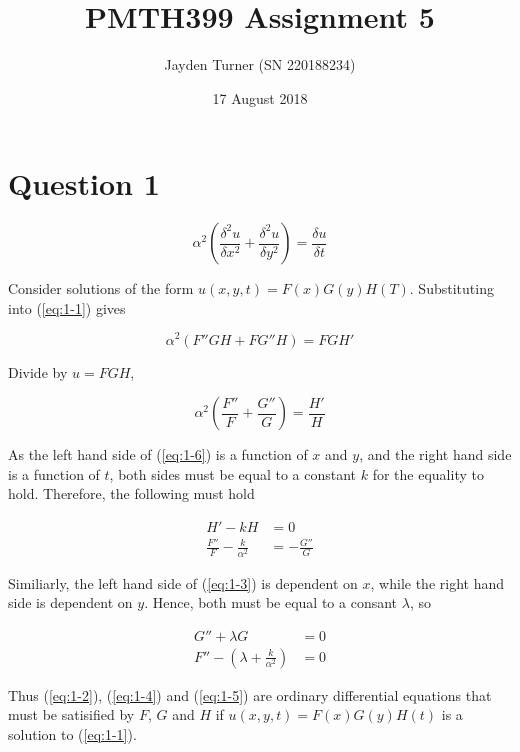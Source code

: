 \documentclass{article}
\title{PMTH399 Assignment 5}
\date{17 August 2018}
\author{Jayden Turner (SN 220188234)}
\newcommand\pd[2]{\frac{\delta{#1}}{\delta{#2}}}
\newcommand\pdsq[2]{\frac{\delta^2{#1}}{\delta{#2}^2}}
\begin{document}
\maketitle
{}

\section*{Question 1}

\begin{equation} \label{eq:1-1}
    \alpha^2\left(\pdsq{u}{x} + \pdsq{u}{y}\right) = \pd{u}{t}
\end{equation}

Consider solutions of the form $u(x, y, t) = F(x)G(y)H(T)$. Substituting into (\ref{eq:1-1}) gives

\begin{equation*}
    \alpha^2(F''GH + FG''H) = FGH'
\end{equation*}

Divide by $u = FGH$,

\begin{equation} \label{eq:1-6}
    \alpha^2\left(\frac{F''}{F} + \frac{G''}{G}\right) = \frac{H'}{H}
\end{equation}

As the left hand side of (\ref{eq:1-6}) is a function of $x$ and $y$, and the right hand side is a function of $t$, both
sides must be equal to a constant $k$ for the equality to hold. Therefore, the following must hold

\begin{align}
    H' - kH &= 0 \label{eq:1-2}\\
    \frac{F''}{F} - \frac{k}{\alpha^2} &= -\frac{G''}{G} \label{eq:1-3}
\end{align}

Similiarly, the left hand side of (\ref{eq:1-3}) is dependent on $x$, while the right hand side is
dependent on $y$. Hence, both must be equal to a consant $\lambda$, so

\begin{align}
    G'' + \lambda G &= 0 \label{eq:1-4}\\
    F'' - \left(\lambda + \frac{k}{\alpha^2}\right) &= 0 \label{eq:1-5}
\end{align}

Thus (\ref{eq:1-2}), (\ref{eq:1-4}) and (\ref{eq:1-5}) are ordinary differential equations that must be
satisified by $F$, $G$ and $H$ if $u(x, y, t) = F(x)G(y)H(t)$ is a solution to (\ref{eq:1-1}).
\end{document}

